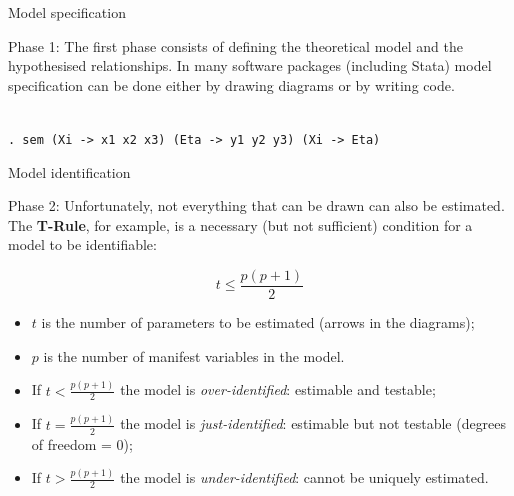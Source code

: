 \documentclass{beamer}
\begin{document}
\begin{frame}{Model specification}
    \begin{block}{Phase 1:}
        The first phase consists of defining the theoretical model and the hypothesised relationships. In many software packages (including Stata) model specification can be done either by drawing diagrams or by writing code. \\
        \vspace{1em}
        \centering
         \\
        \vspace{1em}
        \small
        \texttt{. sem (Xi -> x1 x2 x3) (Eta -> y1 y2 y3) (Xi -> Eta)}
    \end{block}
\end{frame}

\begin{frame}{Model identification}
    \begin{block}{Phase 2:}
        Unfortunately, not everything that can be drawn can also be estimated. The \textbf{T-Rule}, for example, is a necessary (but not sufficient) condition for a model to be identifiable:
    \end{block}
    \[
    t \leq \frac{p(p+1)}{2}
    \]
    \begin{itemize}
        \item $t$ is the number of parameters to be estimated (arrows in the diagrams);
        \item $p$ is the number of manifest variables in the model.
    \end{itemize}
    \vspace{1em}
    \small
    \begin{itemize}
        \item If $t < \frac{p(p+1)}{2}$ the model is \textit{over-identified}: estimable and testable;
        \item If $t = \frac{p(p+1)}{2}$ the model is \textit{just-identified}: estimable but not testable (degrees of freedom = 0);
        \item If $t > \frac{p(p+1)}{2}$ the model is \textit{under-identified}: cannot be uniquely estimated.
    \end{itemize}
\end{frame}
\end{document}
